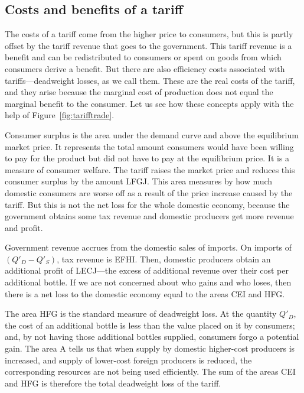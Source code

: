 \newhtmlpage

\subsection*{Costs and benefits of a tariff}

The costs of a tariff come from the higher price to consumers, but this is
partly offset by the tariff revenue that goes to the government. This tariff
revenue is a benefit and can be redistributed to consumers or spent on goods
from which consumers derive a benefit. But there are also efficiency costs
associated with tariffs---deadweight losses, as we call them. These are the
real costs of the tariff, and they arise because the marginal cost of
production does not equal the marginal benefit to the consumer. Let us see
how these concepts apply with the help of Figure~\ref{fig:tarifftrade}.

Consumer surplus is the area under the demand curve and above the
equilibrium market price. It represents the total amount consumers would
have been willing to pay for the product but did not have to pay at the
equilibrium price. It is a measure of consumer welfare. The tariff raises
the market price and reduces this consumer surplus by the amount LFGJ. This
area measures by how much domestic consumers are worse off as a result of
the price increase caused by the tariff. But this is not the net loss for
the whole domestic economy, because the government obtains some tax revenue
and domestic producers get more revenue and profit.

Government revenue accrues from the domestic sales of imports. On imports of 
$(Q'_{D}-Q'_{S})$, tax revenue is EFHI. Then,
domestic producers obtain an additional profit of LECJ---the excess of
additional revenue over their cost per additional bottle. If we are not
concerned about who gains and who loses, then there is a net loss to the
domestic economy equal to the areas CEI and HFG.

The area HFG is the standard measure of deadweight loss. At the quantity 
$Q'_D$, the cost of an additional bottle is less than the value
placed on it by consumers; and, by not having those additional bottles
supplied, consumers forgo a potential gain. The area A tells us that when
supply by domestic higher-cost producers is increased, and supply of
lower-cost foreign producers is reduced, the corresponding resources are not
being used efficiently. The sum of the areas CEI and HFG is therefore the total
deadweight loss of the tariff.

